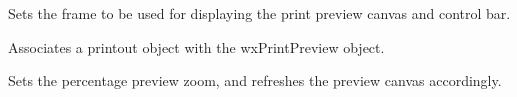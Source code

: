 Sets the frame to be used for displaying the print preview canvas
and control bar.

\label{wxprintpreviewsetprintout}


Associates a printout object with the wxPrintPreview object.

\label{wxprintpreviewsetzoom}


Sets the percentage preview zoom, and refreshes the preview canvas
accordingly.

